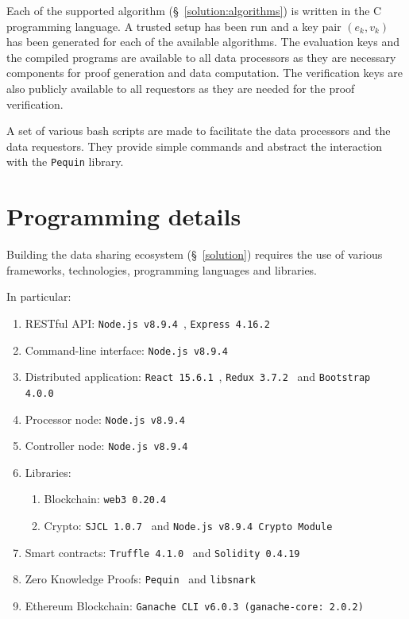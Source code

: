 Each of the supported algorithm (§~\ref{solution:algorithms}) is written in the C programming language. A trusted setup has been run and a key pair $(e_k, v_k)$ has been generated for each of the available algorithms. The evaluation keys and the compiled programs are available to all data processors as they are necessary components for proof generation and data computation. The verification keys are also publicly available to all requestors as they are needed for the proof verification.

A set of various bash scripts are made to facilitate the data processors and the data requestors. They provide simple commands and abstract the interaction with the \verb|Pequin| library.

\section{Programming details}
\label{implemenation:details}

Building the data sharing ecosystem (§~\ref{solution}) requires the use of various frameworks, technologies, programming languages and libraries.

In particular:

\begin{enumerate}
  \item RESTful API: \verb|Node.js v8.9.4|~\cite{nodejs}, \verb|Express 4.16.2|~\cite{expressjs}
  \item Command-line interface: \verb|Node.js v8.9.4|
  \item Distributed application: \verb|React 15.6.1|~\cite{react}, \verb|Redux 3.7.2|~\cite{redux} and \verb|Bootstrap 4.0.0|~\cite{bootstrap}
  \item Processor node: \verb|Node.js v8.9.4|
  \item Controller node: \verb|Node.js v8.9.4|
  \item Libraries:
    \begin{enumerate}
      \item Blockchain: \verb|web3 0.20.4|~\cite{web3js}
      \item Crypto: \verb|SJCL 1.0.7|~\cite{sjcl} and \verb|Node.js v8.9.4 Crypto Module|
    \end{enumerate}
  \item Smart contracts: \verb|Truffle 4.1.0|~\cite{truffle} and \verb|Solidity 0.4.19|~\cite{solidity}
  \item Zero Knowledge Proofs: \verb|Pequin|~\cite{pequin} and \verb|libsnark|~\cite{libsnark}
  \item Ethereum Blockchain: \verb|Ganache CLI v6.0.3 (ganache-core: 2.0.2)|~\cite{ganache}
\end{enumerate}

